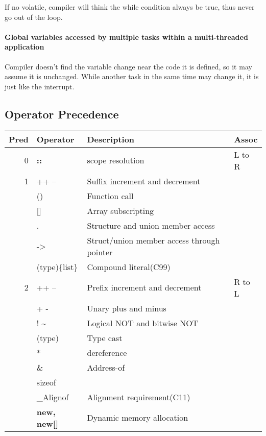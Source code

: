 If no volatile, compiler will think the while condition always be true,
thus never go out of the loop.

\paragraph{Global variables accessed by multiple tasks within a multi-threaded application}
Compiler doesn't find the variable change near the code it is defined,
so it may assume it is unchanged.
While another task in the same time may change it,
it is just like the interrupt.

\subsection{Operator Precedence}

\begin{table}[ht]
  \centering
  \tiny
  \begin{tabular}{r|l|l|l}
    Pred & Operator & Description & Assoc\\
    \hline
    0 & \textbf{\textbf{::}} & scope resolution & L to R\\
    \hline
    1 & ++ -- & Suffix increment and decrement & \\
               & () & Function call & \\
               & [] & Array subscripting & \\
               & . & Structure and union member access & \\
               & -> & Struct/union member access through pointer & \\
               & (type)\{list\} & Compound literal(C99) & \\
    \hline
    2 & ++ -- & Prefix increment and decrement & R to L\\
               & + - & Unary plus and minus & \\
               & ! \textasciitilde{} & Logical NOT and bitwise NOT & \\
               & (type) & Type cast & \\
               & * & dereference & \\
               & \& & Address-of & \\
               & sizeof &  & \\
               & \_Alignof & Alignment requirement(C11) & \\
               & \textbf{\textbf{new, new[]}} & Dynamic memory allocation & \\

\end{tabular}
\end{table}
